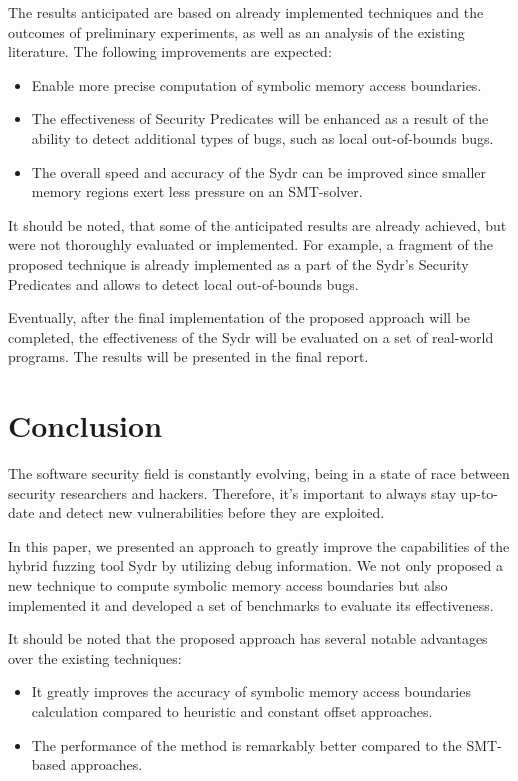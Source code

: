 \documentclass[conference]{IEEEtran}
\begin{document}
The results anticipated are based on already implemented techniques and the outcomes of preliminary experiments, as well as an analysis of the existing literature. The following improvements are expected:

\begin{itemize}
    \item Enable more precise computation of symbolic memory access boundaries.
    \item The effectiveness of Security Predicates will be enhanced as a result of the ability to detect additional types of bugs, such as local out-of-bounds bugs.
    \item The overall speed and accuracy of the Sydr can be improved since smaller memory regions exert less pressure on an SMT-solver.
\end{itemize}

It should be noted, that some of the anticipated results are already achieved, but were not thoroughly evaluated or implemented. For example, a fragment of the proposed technique is already implemented as a part of the Sydr's Security Predicates and allows to detect local out-of-bounds bugs.

Eventually, after the final implementation of the proposed approach will be completed, the effectiveness of the Sydr will be evaluated on a set of real-world programs. The results will be presented in the final report.


\section{Conclusion}

The software security field is constantly evolving, being in a state of race between security researchers and hackers. Therefore, it's important to always stay up-to-date and detect new vulnerabilities before they are exploited.

In this paper, we presented an approach to greatly improve the capabilities of the hybrid fuzzing tool Sydr by utilizing debug information. We not only proposed a new technique to compute symbolic memory access boundaries but also implemented it and developed a set of benchmarks to evaluate its effectiveness.

It should be noted that the proposed approach has several notable advantages over the existing techniques:
\begin{itemize}
    \item It greatly improves the accuracy of symbolic memory access boundaries calculation compared to heuristic and constant offset approaches.
    \item The performance of the method is remarkably better compared to the SMT-based approaches.
\end{itemize}
\end{document}
